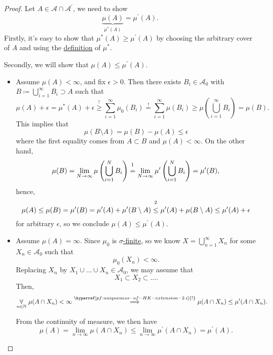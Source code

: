 \begin{proof}
	Let \(A\in \mathcal{A} \cap \mathcal{A} ^\prime \), we need to show
	\[
		\underbrace{\mu (A)}_{\mu ^{*} (A)} = \mu ^\prime (A).
	\]
	Firstly, it's easy to show that \(\mu ^{*} (A)\geq \mu ^\prime (A)\) by choosing the arbitrary cover of \(A\) and using the \hyperref[prop:outer-measure]{definition}  of
	\(\mu ^{*} \).

	Secondly, we will show that \(\mu (A)\leq \mu ^\prime (A)\).
	\begin{itemize}
		\item \label{pf:uniqueness-of-HK-extension-2.i}Assume \(\mu (A)<\infty \), and fix \(\epsilon >0\). Then there exists \(B_{i}\in\mathcal{A} _0\) with \(B\coloneqq \bigcup\limits_{i=1}^{\infty} B_{i}\supset A\)
		      such that
		      \[
			      \mu (A)+\epsilon = \mu ^{*} (A) + \epsilon\overset{\hyperref[prop:outer-measure]{!}}{\geq} \sum\limits_{i=1}^{\infty} \mu _0(B_{i}) \overset{\hyperref[def:pre-measure-countable-additivity-within-the-algebra]{!}}{=} \sum\limits_{i=1}^{\infty} \mu (B_{i})\geq \mu \left(\bigcup\limits_{i=1}^{\infty} B_{i}\right) = \mu (B).
		      \]
		      This implies that
		      \[
			      \mu (B\setminus A) = \mu (B) - \mu (A)\leq \epsilon
		      \]
		      where the first equality comes from \(A\subset B\) and \(\mu (A)<\infty \). On the other hand,
		      \[
			      \mu (B) = \lim\limits_{N \to \infty} \mu \left(\bigcup\limits_{i=1}^{N} B_{i}\right) \overset{\footnotemark}{=} \lim\limits_{N \to \infty} \mu ^\prime \left(\bigcup\limits_{i=1}^{N} B_{i}\right) = \mu ^\prime (B),
		      \]
		      hence,
		      \[
			      \mu (A)\leq \mu (B) = \mu ^\prime (B) = \mu ^\prime (A)+\mu ^\prime (B\setminus A) \overset{\footnotemark}{\leq} \mu ^\prime (A) + \mu (B\setminus A) \leq \mu ^\prime (A) + \epsilon
		      \]
		      for arbitrary \(\epsilon \), so we conclude \(\mu (A)\leq \mu ^\prime (A)\).
		\item Assume \(\mu (A) = \infty \). Since \(\mu _0\) is \hyperref[def:finite-measure]{\(\sigma \)-finite}, so we know \(X = \bigcup\limits_{n=1}^{\infty} X_{n}\) for some \(X_{n}\in\mathcal{A} _0\) such that
		      \[
			      \mu _0(X_{n})<\infty.
		      \]
		      Replacing \(X_{n}\) by \(X_{1}\cup \ldots \cup X_{n} \in\mathcal{A} _0\), we may assume that
		      \[
			      X_1 \subset X_2 \subset \ldots.
		      \]
		      Then,
		      \[
			      \underset{n\in\mathbb{\MakeUppercase{N}} }{\forall}\ \mu (A \cap X_{n})<\infty\overset{\hyperref[pf:uniqueness-of-HK-extension-2.i]{!}}{\implies} \mu (A\cap X_{n})\leq \mu ^\prime (A\cap X_{n}).
		      \]

		      From the continuity of measure, we then have
		      \[
			      \mu (A) = \lim\limits_{n \to \infty} \mu (A\cap X_{n})\leq \lim\limits_{n \to \infty} \mu ^\prime (A\cap X_{n}) = \mu ^\prime (A).
		      \]
	\end{itemize}
\end{proof}

